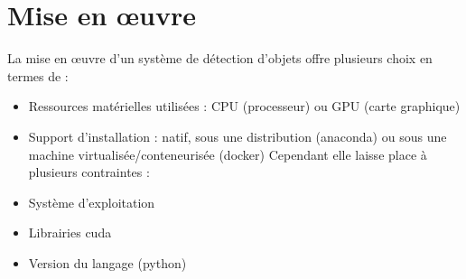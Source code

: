 \documentclass[debug,nodate,hideweeklyreports]{polytech/polytech}
\begin{document}
\section{Mise en œuvre}

La mise en œuvre d’un système de détection d’objets offre plusieurs choix en termes de :
\begin{itemize}
\item Ressources matérielles utilisées : CPU (processeur) ou GPU (carte graphique)
\item Support d’installation : natif, sous une distribution (anaconda) ou sous une machine virtualisée/conteneurisée (docker)
Cependant elle laisse place à plusieurs contraintes :
\item Système d’exploitation
\item Librairies \gls{cuda}
\item Version du langage (python)
\end{itemize}
\end{document}
